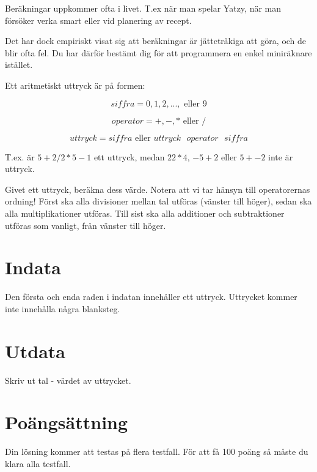 
Beräkningar uppkommer ofta i livet. T.ex när man spelar Yatzy, när man försöker verka smart eller vid planering av recept.

Det har dock empiriskt visat sig att beräkningar är jättetråkiga att göra, och de blir ofta fel. Du har därför
bestämt dig för att programmera en enkel miniräknare istället.

Ett aritmetiskt uttryck är på formen:

$$siffra = 0, 1, 2, ..., \text{ eller } 9$$

$$operator = +, -, * \text{ eller } /$$

$$uttryck = siffra \text{ eller } uttryck \text{ } operator \text{ } siffra$$

T.ex. är $5 + 2 / 2 * 5 - 1$ ett uttryck, medan $22 * 4$, $-5 + 2$ eller $5 + - 2$ inte är uttryck.

Givet ett uttryck, beräkna dess värde. Notera att vi tar hänsyn till operatorernas ordning! Först ska alla divisioner mellan tal utföras (vänster till höger), sedan ska alla multiplikationer utföras. Till sist ska alla additioner och subtraktioner utföras som vanligt, från vänster till höger.

\section*{Indata}
Den första och enda raden i indatan innehåller ett uttryck. Uttrycket kommer inte innehålla några blanksteg.

\section*{Utdata}
Skriv ut tal - värdet av uttrycket.

\section*{Poängsättning}
Din lösning kommer att testas på flera testfall. För att få 100 poäng så måste du klara alla testfall.
